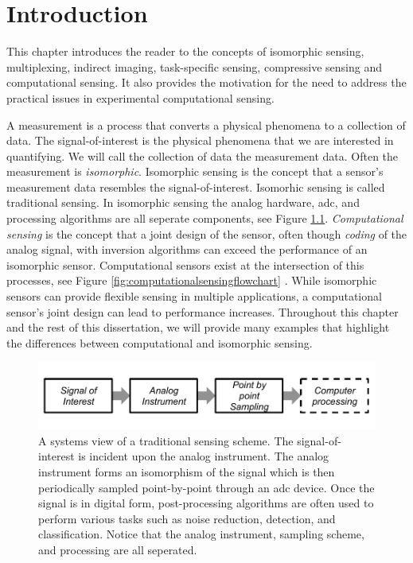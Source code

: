 \chapter{Introduction}

This chapter introduces the reader to the concepts of isomorphic sensing, multiplexing, indirect imaging, task-specific sensing, compressive sensing and computational sensing. It also provides the motivation for the need to address the practical issues in experimental computational sensing. 

A measurement is a process that converts a physical phenomena to a collection of data. The signal-of-interest is the physical phenomena that we are interested in quantifying. We will call the collection of data the measurement data. Often the measurement is \emph{isomorphic}. Isomorphic sensing is the concept that a sensor's measurement data resembles the signal-of-interest. Isomorhic sensing is called traditional sensing. In isomorphic sensing the analog hardware, \acrfull{adc}, and processing algorithms are all seperate components, see Figure \ref{fig:isomorphicsesingflowchart}. \emph{Computational sensing} is the concept that a joint design of the sensor, often though \emph{coding} of the analog signal, with inversion algorithms can exceed the performance of an isomorphic sensor. Computational sensors exist at the intersection of this processes, see Figure \ref{fig:computationalsensingflowchart} \cite{neifeld2006taskSpecificSensing}. While isomorphic sensors can provide flexible sensing in multiple applications, a computational sensor's joint design can lead to performance increases. Throughout this chapter and the rest of this dissertation, we will provide many examples that highlight the differences between computational and isomorphic sensing. 

\begin{figure}
    \centering
    \includegraphics[scale=1]{isomorphicsensorflowchart}
    \caption{A systems view of a traditional sensing scheme. The signal-of-interest is incident upon the analog instrument. The analog instrument forms an isomorphism of the signal which is then periodically sampled point-by-point through an \gls{adc} device. Once the signal is in digital form, post-processing algorithms are often used to perform various tasks such as noise reduction, detection, and classification. Notice that the analog instrument, sampling scheme, and processing are all seperated. }
    \label{fig:isomorphicsesingflowchart}
\end{figure}


